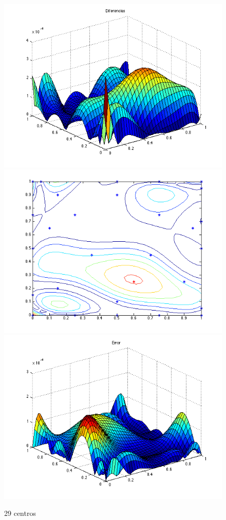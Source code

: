 \documentclass[11pt,a4paper]{article}
\begin{document}
\begin{figure}[H]
\centering

\includegraphics[scale=0.35]{diferencias29.png}
\includegraphics[scale=0.35]{centros29.png}
\includegraphics[scale=0.35]{error29.png}
\caption{29 centros}
\end{figure}
\end{document}
